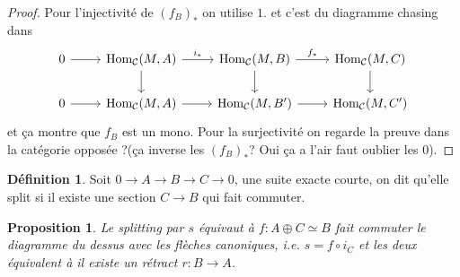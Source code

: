 \documentclass[a4paper,12pt]{book}
\newcommand{\Cat}{\mathcal{C}}
\newcommand{\Hom}{\textrm{Hom}}
\theoremstyle{plain}
\newtheorem{prop}[subsection]{Proposition}
\theoremstyle{definition}
\newtheorem{defn}[subsection]{Définition}
\theoremstyle{remark}
\begin{document}
\begin{proof}
    Pour l'injectivité de $(f_B)_*$ on utilise $1.$ et c'est du 
    diagramme chasing dans
\[\begin{tikzcd}
	0 & {\Hom_{\Cat}(M,A)} & {\Hom_{\Cat}(M,B)} & {\Hom_{\Cat}(M,C)} \\
	0 & {\Hom_{\Cat}(M,A)} & {\Hom_{\Cat}(M,B')} & {\Hom_{\Cat}(M,C')}
	\arrow[from=1-1, to=1-2]
	\arrow["{i_*}", from=1-2, to=1-3]
	\arrow[from=1-2, to=2-2]
	\arrow["{f_*}", from=1-3, to=1-4]
	\arrow[from=1-3, to=2-3]
	\arrow[from=1-4, to=2-4]
	\arrow[from=2-1, to=2-2]
	\arrow[from=2-2, to=2-3]
	\arrow[from=2-3, to=2-4]
\end{tikzcd}\]
    et ça montre que $f_B$ est un mono. Pour la surjectivité on 
    regarde la preuve dans la catégorie opposée ?(ça inverse les
    $(f_B)_*$? Oui ça a l'air faut oublier les $0$).
\end{proof}
\begin{defn}
    Soit $0\to A\to B\to C\to0$, une suite exacte courte, on dit
    qu'elle split si il existe une section $C\to B$ qui fait commuter.
\end{defn}
\begin{prop}
    Le splitting par $s$ équivaut à $f\colon A\oplus C\simeq B$ fait
    commuter le diagramme du dessus avec les flèches canoniques, i.e.
    $s=f\circ i_C$ et les deux équivalent à il existe un rétract
    $r\colon B\to A$.
\end{prop}
\end{document}
